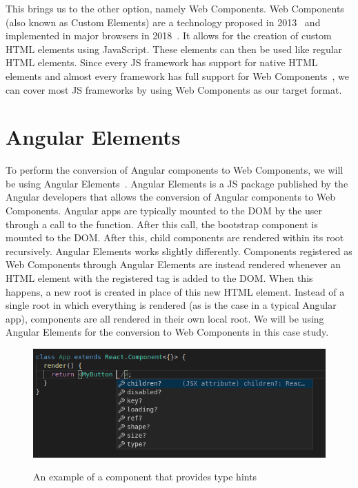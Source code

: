 This brings us to the other option, namely Web Components. Web Components (also known as Custom Elements) are a technology proposed in 2013~ and implemented in major browsers in 2018~. It allows for the creation of custom HTML elements using JavaScript. These elements can then be used like regular HTML elements. Since every JS framework has support for native HTML elements and almost every framework has full support for Web Components~, we can cover most JS frameworks by using Web Components as our target format.

\section{Angular Elements}\label{sec:bg:angularelements}
To perform the conversion of Angular components to Web Components, we will be using Angular Elements~. Angular Elements is a JS package published by the Angular developers that allows the conversion of Angular components to Web Components. Angular apps are typically mounted to the DOM by the user through a call to the  function. After this call, the bootstrap component is mounted to the DOM. After this, child components are rendered within its root recursively. Angular Elements works slightly differently. Components registered as Web Components through Angular Elements are instead rendered whenever an HTML element with the registered tag is added to the DOM\@. When this happens, a new root is created in place of this new HTML element. Instead of a single root in which everything is rendered (as is the case in a typical Angular app), components are all rendered in their own local root. We will be using Angular Elements for the conversion to Web Components in this case study.

\begin{figure}[h]
  \caption{An example of a component that provides type hints}
  \includegraphics[width=\columnwidth]{figures/background/hinting.png}
  \label{fig:bg:hinting}
  \centering
\end{figure}

